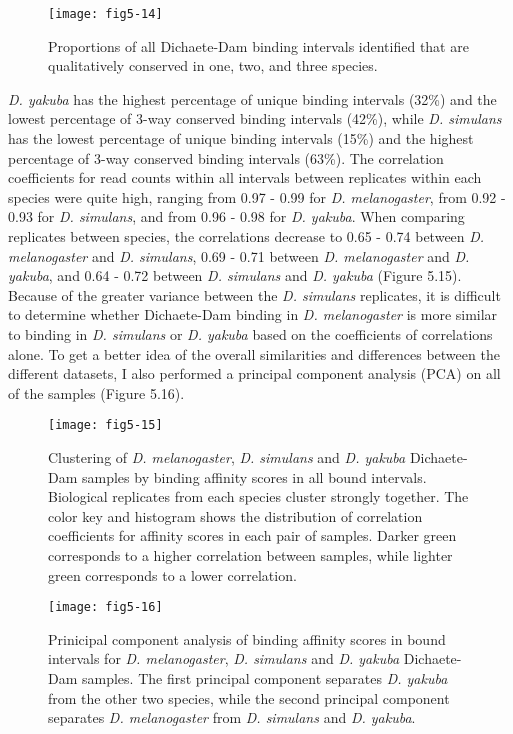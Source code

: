 \begin{figure}
\centering
\texttt{[image: fig5-14]}
\caption{Proportions of all Dichaete-Dam binding intervals identified that are qualitatively conserved in one, two, and three species.}
\label{Figure 5.14}
\end{figure}

\emph{D. yakuba} has the highest percentage of unique binding intervals (32\%) and the lowest percentage of 3-way conserved binding intervals (42\%), while \emph{D. simulans} has the lowest percentage of unique binding intervals (15\%) and the highest percentage of 3-way conserved binding intervals (63\%). The correlation coefficients for read counts within all intervals between replicates within each species were quite high, ranging from 0.97 - 0.99 for \emph{D. melanogaster}, from 0.92 - 0.93 for \emph{D. simulans}, and from 0.96 - 0.98 for \emph{D. yakuba}. When comparing replicates between species, the correlations decrease to 0.65 - 0.74 between \emph{D. melanogaster} and \emph{D. simulans}, 0.69 - 0.71 between \emph{D. melanogaster} and \emph{D. yakuba}, and 0.64 - 0.72 between \emph{D. simulans} and \emph{D. yakuba} (Figure 5.15). Because of the greater variance between the \emph{D. simulans} replicates, it is difficult to determine whether Dichaete-Dam binding in \emph{D. melanogaster} is more similar to binding in \emph{D. simulans} or \emph{D. yakuba} based on the coefficients of correlations alone. To get a better idea of the overall similarities and differences between the different datasets, I also performed a principal component analysis (PCA) on all of the samples (Figure 5.16).\\

\begin{figure}
\centering
\texttt{[image: fig5-15]}
\caption{Clustering of \emph{D. melanogaster}, \emph{D. simulans} and \emph{D. yakuba} Dichaete-Dam samples by binding affinity scores in all bound intervals. Biological replicates from each species cluster strongly together. The color key and histogram shows the distribution of correlation coefficients for affinity scores in each pair of samples. Darker green corresponds to a higher correlation between samples, while lighter green corresponds to a lower correlation.}
\label{Figure 5.15}
\end{figure}

\begin{figure}
\centering
\texttt{[image: fig5-16]}
\caption{Prinicipal component analysis of binding affinity scores in bound intervals for \emph{D. melanogaster}, \emph{D. simulans} and \emph{D. yakuba} Dichaete-Dam samples. The first principal component separates \emph{D. yakuba} from the other two species, while the second principal component separates \emph{D. melanogaster} from \emph{D. simulans} and \emph{D. yakuba}.}
\label{Figure 5.16}
\end{figure}

